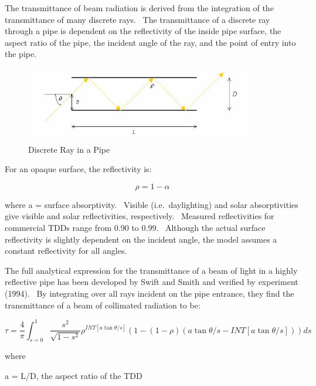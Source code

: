 The transmittance of beam radiation is derived from the integration of the transmittance of many discrete rays.~ The transmittance of a discrete ray through a pipe is dependent on the reflectivity of the inside pipe surface, the aspect ratio of the pipe, the incident angle of the ray, and the point of entry into the pipe.

\begin{figure}[hbtp] %
\centering
\includegraphics[width=0.9\textwidth, height=0.9\textheight, keepaspectratio=true]{media/image871.png}
\caption{  Discrete Ray in a Pipe \protect \label{fig:discrete-ray-in-a-pipe}}
\end{figure}

For an opaque surface, the reflectivity is:

\begin{equation}
\rho  = 1 - \alpha
\end{equation}

where a = surface absorptivity.~ Visible (i.e.~daylighting) and solar absorptivities give visible and solar reflectivities, respectively.~ Measured reflectivities for commercial TDDs range from 0.90 to 0.99.~ Although the actual surface reflectivity is slightly dependent on the incident angle, the model assumes a constant reflectivity for all angles.

The full analytical expression for the transmittance of a beam of light in a highly reflective pipe has been developed by Swift and Smith and verified by experiment (1994).~ By integrating over all rays incident on the pipe entrance, they find the transmittance of a beam of collimated radiation to be:

\begin{equation}
\tau  = \frac{4}{\pi }\int_{s = 0}^1 {\frac{{{s^2}}}{{\sqrt {1 - {s^2}} }}} {\rho ^{INT\left[ {a\tan \theta /s} \right]}}\left( {1 - \left( {1 - \rho } \right)\left( {a\tan \theta /s - INT\left[ {a\tan \theta /s} \right]} \right)} \right)ds
\end{equation}

where

a = L/D, the aspect ratio of the TDD

